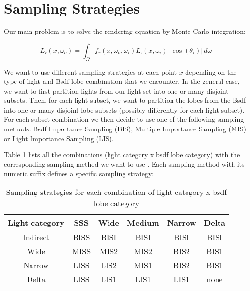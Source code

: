 \documentclass{article}
\begin{document}
\large

\maketitle



\section{Sampling Strategies}\label{Strategies}

Our main problem is to solve the rendering equation by Monte Carlo
integration:

\begin{equation*}
L_r(x,\omega_o)  =  \int_{\Omega}  f_r(x,\omega_o,\omega_i)  L_i(x,\omega_i) \
                   |\cos(\theta_i)|  \  d\omega
\end{equation*}

We want to use different sampling strategies at each point $x$
depending on the type of light and Bsdf lobe combination that we
encounter. In the general case, we want to first partition lights
from our light-set into one or many disjoint subsets. Then, for each
light subset, we want to partition the lobes from the Bsdf into one
or many disjoint lobe subsets (possibly differently for each light
subset). For each subset combination we then decide to use one of
the following sampling methods: Bsdf Importance Sampling (BIS),
Multiple Importance Sampling (MIS) or Light Importance Sampling
(LIS).

Table \ref{table:Strategies} lists all the combinations (light category
x bsdf lobe category) with the corresponding sampling method we want
to use \cite{Colbert:10} \cite{Hery:13} \cite{Pharr:10}
\cite{Shirley:96}. Each sampling method with its numeric suffix defines
a specific sampling strategy:

\begin{table}[ht]
\centering
\begin{tabular}{c c c c c c}
\hline\hline
Light category  &  SSS   &  Wide  &  Medium  &  Narrow  &  Delta  \\ [0.5ex]
\hline
Indirect        &  BISS  &  BISI  &  BISI    &  BISI    &  BISI   \\
Wide            &  MISS  &  MIS2  &  MIS2    &  BIS2    &  BIS1   \\
Narrow          &  LISS  &  LIS2  &  MIS1    &  BIS2    &  BIS1   \\
Delta           &  LISS  &  LIS1  &  LIS1    &  LIS1    &  none   \\ [0.5ex]
\hline
\end{tabular}
\caption{Sampling strategies for each combination of light category x bsdf lobe category}
\label{table:Strategies}
\end{table}
\end{document}
